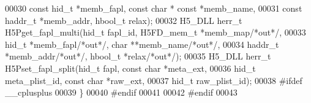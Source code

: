 \begin{DoxyCode}
00030              \textcolor{keyword}{const} hid\_t *memb\_fapl, \textcolor{keyword}{const} \textcolor{keywordtype}{char} * \textcolor{keyword}{const} *memb\_name,
00031              \textcolor{keyword}{const} haddr\_t *memb\_addr, hbool\_t relax);
00032 H5\_DLL herr\_t H5Pget\_fapl\_multi(hid\_t fapl\_id, H5FD\_mem\_t *memb\_map\textcolor{comment}{/*out*/},
00033              hid\_t *memb\_fapl\textcolor{comment}{/*out*/}, \textcolor{keywordtype}{char} **memb\_name\textcolor{comment}{/*out*/},
00034              haddr\_t *memb\_addr\textcolor{comment}{/*out*/}, hbool\_t *relax\textcolor{comment}{/*out*/});
00035 H5\_DLL herr\_t H5Pset\_fapl\_split(hid\_t fapl, \textcolor{keyword}{const} \textcolor{keywordtype}{char} *meta\_ext,
00036              hid\_t meta\_plist\_id, \textcolor{keyword}{const} \textcolor{keywordtype}{char} *raw\_ext,
00037              hid\_t raw\_plist\_id);
00038 \textcolor{preprocessor}{#ifdef \_\_cplusplus}
00039 \}
00040 \textcolor{preprocessor}{#endif}
00041 
00042 \textcolor{preprocessor}{#endif}
00043 
\end{DoxyCode}
